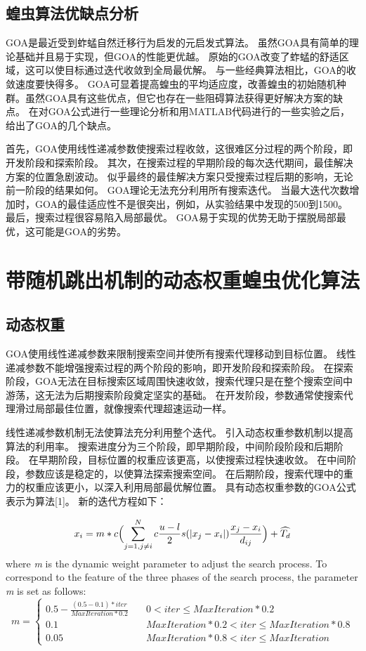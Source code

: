 \subsection{蝗虫算法优缺点分析}
GOA是最近受到蚱蜢自然迁移行为启发的元启发式算法。 虽然GOA具有简单的理论基础并且易于实现，但GOA的性能更优越。 原始的GOA改变了蚱蜢的舒适区域，这可以使目标通过迭代收敛到全局最优解。 与一些经典算法相比，GOA的收敛速度要快得多。 GOA可显着提高蝗虫的平均适应度，改善蝗虫的初始随机种群。虽然GOA具有这些优点，但它也存在一些阻碍算法获得更好解决方案的缺点。 在对GOA公式进行一些理论分析和用MATLAB代码进行的一些实验之后，给出了GOA的几个缺点。

首先，GOA使用线性递减参数使搜索过程收敛，这很难区分过程的两个阶段，即开发阶段和探索阶段。 其次，在搜索过程的早期阶段的每次迭代期间，最佳解决方案的位置急剧波动。 似乎最终的最佳解决方案只受搜索过程后期的影响，无论前一阶段的结果如何。 GOA理论无法充分利用所有搜索迭代。 当最大迭代次数增加时，GOA的最佳适应性不是很突出，例如，从实验结果中发现的500到1500。 最后，搜索过程很容易陷入局部最优。 GOA易于实现的优势无助于摆脱局部最优，这可能是GOA的劣势。


\section{带随机跳出机制的动态权重蝗虫优化算法}
\subsection{动态权重}
GOA使用线性递减参数来限制搜索空间并使所有搜索代理移动到目标位置。 线性递减参数不能增强搜索过程的两个阶段的影响，即开发阶段和探索阶段。 在探索阶段，GOA无法在目标搜索区域周围快速收敛，搜索代理只是在整个搜索空间中游荡，这无法为后期搜索阶段奠定坚实的基础。 在开发阶段，参数通常使搜索代理滑过局部最佳位置，就像搜索代理超速运动一样。

线性递减参数机制无法使算法充分利用整个迭代。 引入动态权重参数机制以提高算法的利用率。 搜索进度分为三个阶段，即早期阶段，中间阶段阶段和后期阶段。 在早期阶段，目标位置的权重应该更高，以使搜索过程快速收敛。 在中间阶段，参数应该是稳定的，以使算法探索搜索空间。 在后期阶段，搜索代理中的重力的权重应该更小，以深入利用局部最优解位置。 具有动态权重参数的GOA公式表示为算法[1]。 新的迭代方程如下：

\begin{equation}
    x_i = m*c \Bigl(\sum_{j=1,j\neq{i}}^N c \frac{u-l}{2}s (\lvert x_j-x_i \rvert )\frac{x_j-x_i}{d_{ij}} \Bigr) + \widehat{T_d}
\end{equation}
where \emph{m} is the dynamic weight parameter to adjust the search process. To correspond to the feature of the three phases of the search process, the parameter \emph{m} is set as follows:
\begin{equation}
    m= \begin{cases}
        0.5-\frac{(0.5-0.1)*iter}{MaxIteration*0.2} & \quad 0<iter\leq MaxIteration*0.2 \\
        0.1&\quad MaxIteration*0.2<iter \leq MaxIteration*0.8 \\
        0.05& \quad  MaxIteration*0.8 < iter \leq MaxIteration
        \end{cases} 
\end{equation}

